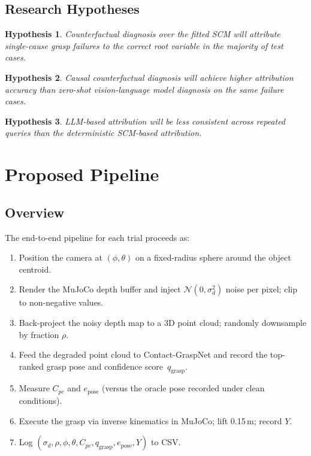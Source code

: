\documentclass[journal]{IEEEtran}
\newtheorem{hypothesis}{Hypothesis}
\begin{document}
\subsection{Research Hypotheses}

\begin{hypothesis}
  Counterfactual diagnosis over the fitted SCM will attribute
  single-cause grasp failures to the correct root variable in
  the majority of test cases.
\end{hypothesis}
\begin{hypothesis}
  Causal counterfactual diagnosis will achieve higher attribution
  accuracy than zero-shot vision-language model diagnosis on the
  same failure cases.
\end{hypothesis}
\begin{hypothesis}
  LLM-based attribution will be less consistent across repeated
  queries than the deterministic SCM-based attribution.
\end{hypothesis}

\section{Proposed Pipeline}
\label{sec:method}

\subsection{Overview}

The end-to-end pipeline for each trial proceeds as:
\begin{enumerate}
  \item Position the camera at $(\phi, \theta)$ on a fixed-radius
        sphere around the object centroid.
  \item Render the MuJoCo depth buffer and inject
        $\mathcal{N}(0, \sigma_d^2)$ noise per pixel; clip
        to non-negative values.
  \item Back-project the noisy depth map to a 3D point cloud;
        randomly downsample by fraction $\rho$.
  \item Feed the degraded point cloud to Contact-GraspNet and
        record the top-ranked grasp pose and confidence
        score~$q_{\text{grasp}}$.
  \item Measure $C_{pc}$ and $e_{\text{pose}}$ (versus the
        oracle pose recorded under clean conditions).
  \item Execute the grasp via inverse kinematics in MuJoCo;
        lift 0.15\,m; record $Y$.
  \item Log $(\sigma_d, \rho, \phi, \theta, C_{pc},
        q_{\text{grasp}}, e_{\text{pose}}, Y)$ to CSV.
\end{enumerate}
\end{document}
